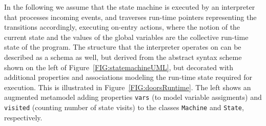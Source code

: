 \documentclass[english,submission]{programming}
\begin{document}



In the following we assume that the state machine is executed by an interpreter that processes incoming events, and traverses run-time pointers representing the transitions accordingly, executing on-entry actions, where the notion of the current state and the values of the global variables are the collective run-time state of the program. The structure that the interpreter operates on can be described as a schema as well, but derived from the abstract syntax scheme shown on the left of Figure~\ref{FIG:statemachineUML}, but decorated with additional properties and associations modeling the run-time state required for execution. This is illustrated in Figure~\ref{FIG:doorsRuntime}. The left shows an augmented metamodel adding properties \lstinline{vars} (to model variable assigments) and \lstinline{visited} (counting number of state visits) to the classes \lstinline{Machine} and \lstinline{State}, respectively. 
\end{document}
